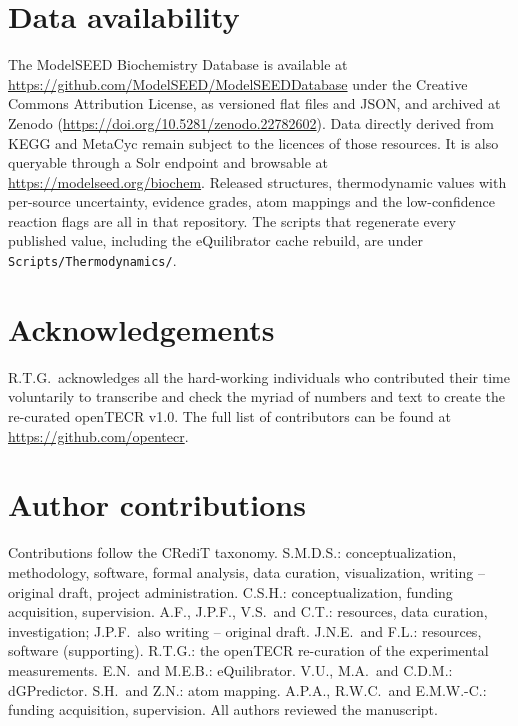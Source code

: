 \documentclass[unnumsec,webpdf,modern,large]{oup-authoring-template}
\newcommand{\modelseedurl}{\url{https://modelseed.org/biochem}}
\newcommand{\file}[1]{\texttt{#1}}                  %
\providecommand{\DIFaddend}{} %
\begin{document}
\DIFaddend \section{Data availability}

The ModelSEED Biochemistry Database is available at \url{https://github.com/ModelSEED/ModelSEEDDatabase} under the Creative Commons Attribution License, as versioned flat files and JSON, and archived at Zenodo (\url{https://doi.org/10.5281/zenodo.22782602}). Data directly derived from KEGG and MetaCyc remain subject to the licences of those resources. It is also queryable through a Solr endpoint and browsable at \modelseedurl. Released structures, thermodynamic values with per-source uncertainty, evidence grades, atom mappings and the low-confidence reaction flags are all in that repository. The scripts that regenerate every published value, including the eQuilibrator cache rebuild, are under \file{Scripts/Thermodynamics/}.

\section{Acknowledgements} R.T.G.\ acknowledges all the hard-working individuals who contributed their time voluntarily to transcribe and check the myriad of numbers and text to create the re-curated openTECR v1.0. The full list of contributors can be found at \url{https://github.com/opentecr}.

\section{Author contributions} Contributions follow the CRediT taxonomy. S.M.D.S.: conceptualization, methodology, software, formal analysis, data curation, visualization, writing -- original draft, project administration. C.S.H.: conceptualization, funding acquisition, supervision. A.F., J.P.F., V.S.\ and C.T.: resources, data curation, investigation; J.P.F.\ also writing -- original draft. J.N.E.\ and F.L.: resources, software (supporting). R.T.G.: the openTECR re-curation of the experimental measurements. E.N.\ and M.E.B.: eQuilibrator. V.U., M.A.\ and C.D.M.: dGPredictor. S.H.\ and Z.N.: atom mapping. A.P.A., R.W.C.\ and E.M.W.-C.: funding acquisition, supervision. All authors reviewed the manuscript.
\end{document}
